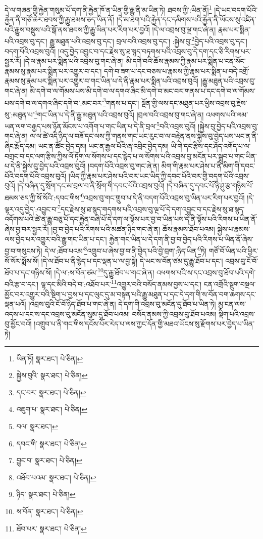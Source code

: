 དེ་ལ་གཞན་གྱི་རྐྱེན་གསུམ་པོ་དག་ནི་རྐྱེན་ཁོ་ན་ཡིན་གྱི་རྒྱུ་ནི་མ་ཡིན་ཏེ། ཐབས་ཀྱི་:ཡིན་ནོ།\footnote{ཡིན་ཏོ།  སྣར་ཐང་།  པེ་ཅིན། } །དེ་ཡང་བདག་པོའི་རྐྱེན་ནི་གཙོ་ཆེར་ཐབས་ཀྱི་རྒྱུ་ཐམས་ཅད་ཡིན་ནོ། །དེ་མ་ཐག་པའི་རྐྱེན་དང་དམིགས་པའི་རྐྱེན་ནི་ཡོངས་སུ་འཛིན་པའི་རྒྱུས་བསྡུས་པའི་སྒོ་ནས་ཐབས་ཀྱི་རྒྱུ་ཡིན་པར་རིག་པར་བྱའོ། །དེ་ལ་འབྲས་བུ་ལྔ་གང་ཞེ་ན། རྣམ་པར་སྨིན་པའི་འབྲས་བུ་དང་། རྒྱུ་མཐུན་པའི་འབྲས་བུ་དང་། བྲལ་བའི་འབྲས་བུ་དང་། :སྐྱེས་བུ་\footnote{སྐྱེས་བུའི་  སྣར་ཐང་།  པེ་ཅིན། }བྱེད་པའི་འབྲས་བུ་དང་། བདག་པོའི་འབྲས་བུའོ། །འདུ་བྱེད་འབྱུང་བ་དང་རྗེས་སུ་ཐ་སྙད་བཏགས་པའི་འབྲས་བུ་དེ་དག་དང་ཅི་རིགས་པར་སྦྱར་རོ། །དེ་ལ་རྣམ་པར་སྨིན་པའི་འབྲས་བུ་གང་ཞེ་ན། མི་དགེ་བའི་ཆོས་རྣམས་ཀྱི་རྣམ་པར་སྨིན་པ་ངན་སོང་རྣམས་སུ་རྣམ་པར་སྨིན་པར་འགྱུར་བ་དང་། དགེ་བ་ཟག་པ་དང་བཅས་པ་རྣམས་ཀྱི་རྣམ་པར་སྨིན་པ་བདེ་འགྲོ་རྣམས་སུ་རྣམ་པར་སྨིན་པར་འགྱུར་བ་གང་ཡིན་པ་དེ་ནི་རྣམ་པར་སྨིན་པའི་འབྲས་བུའོ། །རྒྱུ་མཐུན་པའི་འབྲས་བུ་གང་ཞེ་ན། མི་དགེ་བ་ལ་གོམས་པས་མི་དགེ་བ་ལ་དགའ་ཞིང་མི་དགེ་བ་མང་བར་གནས་པ་དང་དགེ་བ་ལ་གོམས་པས་དགེ་བ་ལ་དགའ་ཞིང་དགེ་བ་:མང་བར་\footnote{དང་བར་  སྣར་ཐང་།  པེ་ཅིན། }གནས་པ་དང་། སྔོན་གྱི་ལས་དང་མཐུན་པར་ཕྱིས་འབྲས་བུ་རྗེས་སུ་:མཐུན་པ་\footnote{འཇུག་པ་  སྣར་ཐང་།  པེ་ཅིན། }གང་ཡིན་པ་དེ་ནི་རྒྱུ་མཐུན་པའི་འབྲས་བུའོ། །བྲལ་བའི་འབྲས་བུ་གང་ཞེ་ན། འཕགས་པའི་ལམ་ཡན་ལག་བརྒྱད་པས་ཉོན་མོངས་པ་འགོག་པ་གང་ཡིན་པ་དེ་ནི་བྲལ་\footnote{བལ་  སྣར་ཐང་། }བའི་འབྲས་བུའོ། །སྐྱེས་བུ་བྱེད་པའི་འབྲས་བུ་གང་ཞེ་ན། ལ་ལ་ཚེ་འདི་ཉིད་ལ་བཟོ་དང་ལས་ཀྱི་གནས་གང་ཡང་རུང་བ་ལ་བརྟེན་ནས་སྐྱེས་བུ་བྱེད་པས་ཡང་ན་ནི་ཞིང་རྨོད་དམ། ཡང་ན་ཚོང་བྱེད་དམ། ཡང་ན་རྒྱལ་པོའི་ཞ་འབྲིང་བྱེད་དམ། ཡི་གེ་དང་རྩིས་དང་ཤོད་འགོད་པ་ལ་བགྲང་བ་དང་ལག་རྩིས་ཀྱིས་ལོ་ཏོག་ལ་སོགས་པ་དང་རྙེད་པ་ལ་སོགས་པའི་འབྲས་བུ་མངོན་པར་སྒྲུབ་པ་གང་ཡིན་པ་དེ་ནི་སྐྱེས་བུ་བྱེད་པའི་འབྲས་བུའོ། །བདག་པོའི་འབྲས་བུ་གང་ཞེ་ན། མིག་གི་རྣམ་པར་ཤེས་པ་ནི་མིག་གི་དབང་པོའི་བདག་པོའི་འབྲས་བུའོ། །ཡིད་ཀྱི་རྣམ་པར་ཤེས་པའི་བར་ཡང་ཡིད་ཀྱི་དབང་པོའི་བར་གྱི་བདག་པོའི་འབྲས་བུའོ། །དེ་བཞིན་དུ་སྲོག་དང་མ་བྲལ་བ་ནི་སྲོག་གི་དབང་པོའི་འབྲས་བུའོ། །དེ་བཞིན་དུ་དབང་པོ་ཉི་ཤུ་རྩ་གཉིས་པོ་ཐམས་ཅད་ཀྱི་སོ་སོའི་:དབང་གིས་\footnote{དབང་གི་  སྣར་ཐང་།  པེ་ཅིན། }འབྲས་བུ་གང་གྲུབ་པ་དེ་ནི་བདག་པོའི་འབྲས་བུ་ཡིན་པར་རིག་པར་བྱའོ། །དེ་ལྟར་འདུ་བྱེད་:འབྱུང་བ་\footnote{བྱུང་བ་  སྣར་ཐང་།  པེ་ཅིན། }དང་རྗེས་སུ་ཐ་སྙད་གདགས་པའི་འབྲས་བུ་ལྔ་པོ་དེ་དག་འབྱུང་བ་དང་རྗེས་སུ་ཐ་སྙད་འདོགས་པའི་ཚེ་ན་རྒྱུ་བཅུ་པོ་དང་རྐྱེན་བཞི་པོ་དེ་དག་ལ་ལྟོས་པར་བྱ་བ་ཡིན་པས་དེ་ནི་ལྟོས་པའི་རིགས་པ་ཡིན་ནོ་ཞེས་བྱ་བར་སྦྱར་རོ། །བྱ་བ་བྱེད་པའི་རིགས་པའི་མཚན་ཉིད་གང་ཞེ་ན། ཆོས་རྣམས་ཐོབ་པའམ། སྐྱེས་པ་རྣམས་ལས་བྱེད་པར་འགྱུར་བའི་རྒྱུ་གང་ཡིན་པ་དང་། རྐྱེན་གང་ཡིན་པ་དེ་དག་ནི་བྱ་བ་བྱེད་པའི་རིགས་པ་ཡིན་ནོ་ཞེས་བྱ་བ་གསུངས་ཏེ། དེ་ལ་:ཐོབ་པའམ་\footnote{འཐོབ་པའམ་  སྣར་ཐང་།  པེ་ཅིན། }འགྲུབ་པ་ཞེས་བྱ་བ་ནི་བྱེད་པའི་བྱེ་བྲག་:ཉིད་ཡིན་\footnote{ཉིད་  སྣར་ཐང་།  པེ་ཅིན། }ཏེ། གཙོ་བོ་ཡིན་པའི་ཕྱིར་སོ་སོར་སྨོས་སོ། །དེ་ལ་ཐོབ་པ་ནི་རྙེད་པ་དང་ལྡན་པ་ལ་བྱ་སྟེ། དེ་ཡང་ས་བོན་ཙམ་དུ་རྒྱུ་ཐོབ་པ་དང་། འབྲས་བུ་ངོ་བོ་ཐོབ་པ་དང་གཉིས་སོ། །དེ་ལ་:ས་བོན་ཙམ་\footnote{ས་བོན་  སྣར་ཐང་།  པེ་ཅིན། }དུ་རྒྱུ་ཐོབ་པ་གང་ཞེ་ན། འཕགས་པའི་ས་དང་འབྲས་བུ་ཐོབ་པའི་དགེ་བའི་རྩ་བ་དང་། ལྷ་དང་མིའི་བདེ་བ་:འཐོབ་པར་\footnote{ཐོབ་པར་  སྣར་ཐང་།  པེ་ཅིན། }འགྱུར་བའི་བསོད་ནམས་བྱས་པ་དང་། ངན་འགྲོའི་སྡུག་བསྔལ་མྱོང་བར་འགྱུར་བའི་སྡིག་པ་བྱས་པ་དང་ལུང་དུ་མ་བསྟན་པའི་རྒྱུ་མཐུན་པ་དང་དེ་དག་གི་ས་བོན་བག་ཆགས་དང་ལྡན་པའོ། །འབྲས་བུའི་ངོ་བོ་ཉིད་ཐོབ་པ་གང་ཞེ་ན། དེ་དག་གི་འབྲས་བུ་མངོན་དུ་ཐོབ་པ་ཡིན་ཏེ། མྱ་ངན་ལས་འདས་པ་དང་ས་དང་འབྲས་བུ་མངོན་སུམ་དུ་ཐོབ་པའམ། བསོད་ནམས་ཀྱི་འབྲས་བུ་ཐོབ་པའམ། སྡིག་པའི་འབྲས་བུ་མྱོང་བའོ། །འགྲུབ་པ་ནི་གང་གིས་དངོས་པོར་རེད་པ་ལས་ཀྱང་དོན་གྱི་མཐའ་ཡོངས་སུ་རྫོགས་པར་བྱེད་པ་ཡིན་ཏེ། 